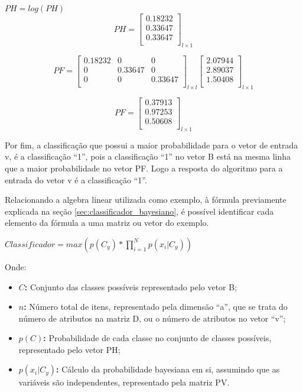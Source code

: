 \begin{anexosenv}
\begin{center}
$PH = log(PH)$
$$PH=\left[
\begin{array}{c}
0.18232 \\
0.33647 \\
0.33647 \\
\end{array}
\right]_{l \times 1}$$
\end{center}

$$PF=\left[
\begin{array}{ccccc}
0.18232 & 0 & 0 \\
0 & 0.33647 & 0 \\
0 & 0 & 0.33647 \\
\end{array}
\right]_{l \times l}
\left[
\begin{array}{c}
2.07944 \\
2.89037 \\
1.50408 \\
\end{array}
\right]_{l \times 1}
$$

$$PF=\left[
\begin{array}{c}
0.37913 \\
0.97253 \\
0.50608 \\
\end{array}
\right]_{l \times 1}
$$

Por fim, a classificação que possui a maior probabilidade para o vetor de
entrada v, é a classificação ``1'', pois a classificação ``1'' no vetor
B está na mesma linha que a maior probabilidade no vetor PF. Logo a resposta
do algoritmo para a entrada do vetor v é a classificação ``1''.

Relacionando a algebra linear utilizada como exemplo, à fórmula previamente
explicada na seção \ref{sec:classificador_bayesiano}, é possível identificar cada
elemento da fórmula a uma matriz ou vetor do exemplo.

$Classificador = max(p(C_{y})*\prod_{i=1}^{N}p(x_{i}|C_{y}))$

Onde:

\begin{itemize}
    \item \textbf{$C$:} Conjunto das classes possíveis representado pelo vetor B;
    \item \textbf{$n$: } Número total de itens, representado pela dimensão ``a'',
    que se trata do número de atributos na matriz D, ou o número de atributos
    no vetor ``v'';
    \item \textbf{$p(C)$: } Probabilidade de cada classe no conjunto de classes
    possíveis, representado pelo vetor PH;
    \item \textbf{$p(x_{i}|C_{y})$: } Cálculo da probabilidade bayesiana
    em si, assumindo que as variáveis são independentes, representado pela
    matriz PV.
\end{itemize}



\end{anexosenv}
